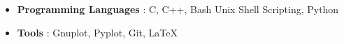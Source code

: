 \\[-1 cm]\\
\begin{itemize}
  \item \textbf{Programming Languages} : C, C++, Bash Unix Shell Scripting, Python \\[-0.6cm]
  \item \textbf{Tools} : Gnuplot, Pyplot, Git, \LaTeX \\[-0.6cm]
\end{itemize}

